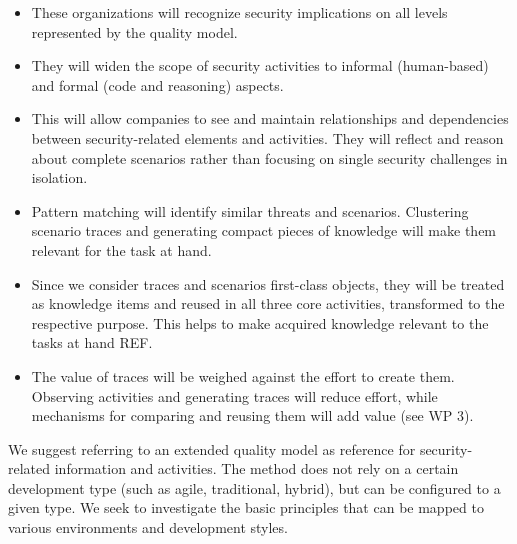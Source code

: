 \begin{itemize}
\vspace{-0.5em} \item These organizations will recognize security implications on all levels represented by the quality model.
\vspace{-0.5em} \item They will widen the scope of security activities to informal (human-based) and formal (code and reasoning) aspects.
\vspace{-0.5em} \item This will allow companies to see and maintain relationships and dependencies between security-related elements and activities. They will reflect and reason about complete scenarios rather than focusing on single security challenges in isolation.
\vspace{-0.5em} \item Pattern matching will identify similar threats and scenarios. Clustering scenario traces and generating compact pieces of knowledge will make them relevant for the task at hand.
\vspace{-0.5em} \item Since we consider traces and scenarios first-class objects, they will be treated as knowledge items and reused in all three core activities, transformed to the respective purpose. This helps to make acquired knowledge relevant to the tasks at hand REF.
\vspace{-0.5em} \item The value of traces will be weighed against the effort to create them. Observing activities and generating traces will reduce effort, while mechanisms for comparing and reusing them will add value (see WP 3).
\end{itemize}

We suggest referring to an extended quality model as reference for security-related information and activities. The method does not rely on a certain development type (such as agile, traditional, hybrid), but can be configured to a given type. We seek to investigate the basic principles that can be mapped to various environments and development styles.
